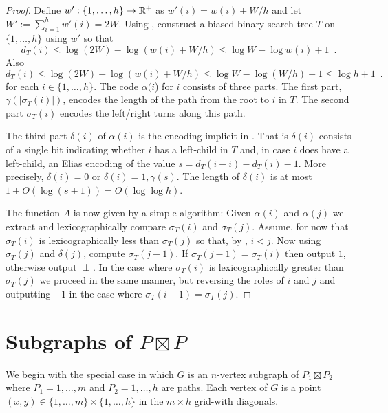 \documentclass[kpfonts]{patmorin}
\newcommand{\pnote}[1]{\ \newline\noindent\fcolorbox{red}{yellow}{\begin{minipage}{\textwidth}#1\end{minipage}}}
\begin{document}
\begin{proof}
  Define $w':\{1,\ldots,h\}\to \mathbb{R}^+$ as $w'(i)=w(i)+W/h$ and let $W':=\sum_{i=1}^h w'(i)=2W$.
  Using , construct a biased binary search tree $T$ on $\{1,\ldots,h\}$ using $w'$ so that 
  \[   
    d_T(i)\le\log (2W)-\log(w(i)+W/h) \le \log W-\log w(i)+1 \enspace .
  \]
  Also
  \[
  d_T(i)\le\log (2W)-\log(w(i)+W/h) \le \log W-\log (W/h)+1 \le \log h + 1\enspace .
  \]
  for each $i\in\{1,\ldots,h\}$.  The code $\alpha(i$) for $i$ consists of three parts.  The first part, $\gamma(|\sigma_T(i)|)$, encodes the length of the path from the root to $i$ in $T$. The second part $\sigma_T(i)$ encodes the left/right turns along this path.  
  
  The third part $\delta(i)$ of $\alpha(i)$ is the encoding implicit in .  That is $\delta(i)$ consists of
  a single bit indicating whether $i$ has a left-child in $T$ and, in case $i$ does have a left-child, an Elias encoding of the value $s=d_T(i-i)-d_T(i)-1$.  More precisely, $\delta(i)=0$ or $\delta(i)=1,\gamma(s)$.  The length of $\delta(i)$ is at most $1+O(\log(s+1))=O(\log\log h)$.

  The function $A$ is now given by a simple algorithm: Given $\alpha(i)$ and $\alpha(j)$ we extract and lexicographically compare $\sigma_T(i)$ and $\sigma_T(j)$.  Assume, for now that $\sigma_T(i)$ is lexicographically less than $\sigma_T(j)$ so that, by , $i < j$.  Now using $\sigma_T(j)$ and $\delta(j)$, compute $\sigma_T(j-1)$.  If $\sigma_T(j-1)=\sigma_T(i)$ then output $1$, otherwise output $\perp$.
  In the case where $\sigma_T(i)$ is lexicographically greater than $\sigma_T(j)$ we proceed in the same manner, but reversing the roles of $i$ and $j$ and outputting $-1$ in the case where $\sigma_T(i-1)=\sigma_T(j)$.
\end{proof}

\section{Subgraphs of $P\boxtimes P$}

We begin with the special case in which $G$ is an $n$-vertex subgraph of $P_1\boxtimes P_2$ where $P_1=1,\ldots,m$ and $P_2=1,\ldots,h$ are paths. Each vertex of $G$ is a point $(x,y)\in\{1,\ldots,m\}\times \{1,\ldots,h\}$ in the $m\times h$ grid-with diagonals.  

\end{document}
